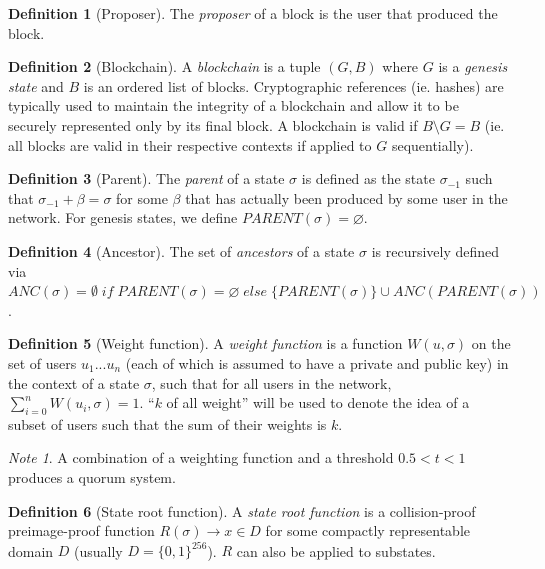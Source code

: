 \documentclass[11pt,a4paper]{report}
\theoremstyle{plain}
\theoremstyle{definition}
\newtheorem{defn}{Definition}[chapter]
\theoremstyle{remark}
\newtheorem*{note}{Note}
\begin{document}
\begin{defn}[Proposer]
The \emph{proposer} of a block is the user that produced the block.
\end{defn}

\begin{defn}[Blockchain]
A \emph{blockchain} is a tuple $(G, B)$ where $G$ is a \emph{genesis state} and $B$ is an ordered list of blocks. Cryptographic references (ie. hashes) are typically used to maintain the integrity of a blockchain and allow it to be securely represented only by its final block. A blockchain is valid if $B \setminus G = B$ (ie. all blocks are valid in their respective contexts if applied to $G$ sequentially). 
\end{defn}

\begin{defn}[Parent]
The \emph{parent} of a state $\sigma$ is defined as the state $\sigma_{-1}$ such that $\sigma_{-1} + \beta = \sigma$ for some $\beta$ that has actually been produced by some user in the network. For genesis states, we define $PARENT(\sigma) = \varnothing$.
\end{defn}

\begin{defn}[Ancestor]
The set of \emph{ancestors} of a state $\sigma$ is recursively defined via $ANC(\sigma) = \emptyset \; if \; PARENT(\sigma) = \varnothing \; else \; \{PARENT(\sigma)\} \cup ANC(PARENT(\sigma))$.
\end{defn}

\begin{defn}[Weight function]
A \emph{weight function} is a function $W(u, \sigma)$ on the set of users $u_1 ... u_n$ (each of which is assumed to have a private and public key) in the context of a state $\sigma$, such that for all users in the network, $\sum_{i=0}^n W(u_i, \sigma) = 1$. ``$k$ of all weight'' will be used to denote the idea of a subset of users such that the sum of their weights is $k$. 
\end{defn}

\begin{note}
A combination of a weighting function and a threshold $0.5 < t < 1$ produces a quorum system.
\end{note}

\begin{defn}[State root function]
A \emph{state root function} is a collision-proof preimage-proof function $R(\sigma) \rightarrow x \in D$ for some compactly representable domain $D$ (usually $D = \{0,1\}^{256}$). $R$ can also be applied to substates.
\end{defn}
\end{document}

